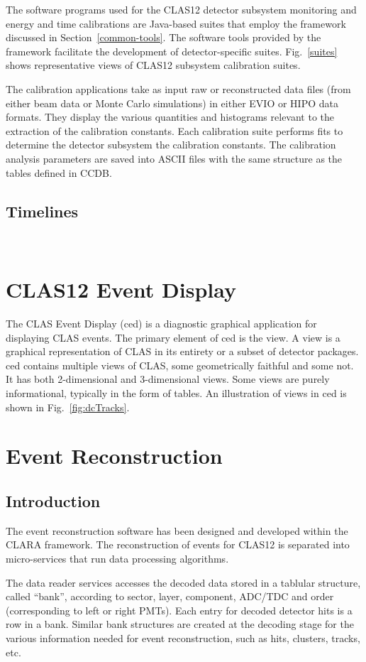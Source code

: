 \documentclass[3p,times,twocolumn]{elsarticle}
\begin{document}
The software programs used for the CLAS12 detector subsystem monitoring and energy and time calibrations are
Java-based suites that employ the framework discussed in Section~\ref{common-tools}.
The software tools provided by the framework facilitate the development of
detector-specific suites. Fig.~\ref{suites} shows representative views of CLAS12 subsystem calibration suites.

The calibration applications take as input raw or reconstructed data files
(from either beam data or Monte Carlo simulations) in
either EVIO or HIPO data formats.  They display the various quantities and histograms relevant to the
extraction of the calibration constants.  Each calibration suite performs fits to determine the detector subsystem
the calibration constants.  The calibration analysis parameters are saved into ASCII files
with the same structure as the tables defined in CCDB.

\subsection{Timelines}
~~

\section{CLAS12 Event Display}
The CLAS Event Display (ced) is a diagnostic graphical application for displaying CLAS events.
The primary element of ced is the view. A view is a graphical representation of CLAS in its
entirety or a subset of detector packages.
ced contains multiple views of CLAS, some geometrically faithful and some not.
It has both 2-dimensional and 3-dimensional views. Some views are purely informational, typically in the form of tables.
An illustration of views in ced is shown in Fig.~\ref{fig:dcTracks}.

\section{Event Reconstruction}
\subsection{Introduction}

The event reconstruction software has been designed and developed within the CLARA framework.
The reconstruction of events for CLAS12 is separated into micro-services that run data processing algorithms.

The data reader services accesses the decoded data stored in a tablular structure,
called ``bank'', according to
sector, layer, component, ADC/TDC and order (corresponding to left or right PMTs). Each entry for decoded
detector hits is a row in a bank.  Similar bank structures are created at the decoding stage for the
various information needed for event reconstruction, such as hits, clusters, tracks, etc.
\end{document}
